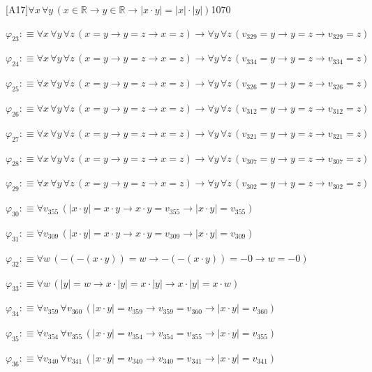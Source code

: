 \begin{fullproof}{[A17]}{$\forall x\,\forall y\,(x \in \mathbb{R} \to y \in \mathbb{R} \to \lvert x \cdot y \rvert = \lvert x \rvert \cdot \lvert y \rvert)$}{1070}
\begin{abbrevlist}
\item $\varphi_{23} :\equiv \forall x\,\forall y\,\forall z\,(x = y \to y = z \to x = z) \to \forall y\,\forall z\,(v_{329} = y \to y = z \to v_{329} = z)$
\item $\varphi_{24} :\equiv \forall x\,\forall y\,\forall z\,(x = y \to y = z \to x = z) \to \forall y\,\forall z\,(v_{334} = y \to y = z \to v_{334} = z)$
\item $\varphi_{25} :\equiv \forall x\,\forall y\,\forall z\,(x = y \to y = z \to x = z) \to \forall y\,\forall z\,(v_{326} = y \to y = z \to v_{326} = z)$
\item $\varphi_{26} :\equiv \forall x\,\forall y\,\forall z\,(x = y \to y = z \to x = z) \to \forall y\,\forall z\,(v_{312} = y \to y = z \to v_{312} = z)$
\item $\varphi_{27} :\equiv \forall x\,\forall y\,\forall z\,(x = y \to y = z \to x = z) \to \forall y\,\forall z\,(v_{321} = y \to y = z \to v_{321} = z)$
\item $\varphi_{28} :\equiv \forall x\,\forall y\,\forall z\,(x = y \to y = z \to x = z) \to \forall y\,\forall z\,(v_{307} = y \to y = z \to v_{307} = z)$
\item $\varphi_{29} :\equiv \forall x\,\forall y\,\forall z\,(x = y \to y = z \to x = z) \to \forall y\,\forall z\,(v_{302} = y \to y = z \to v_{302} = z)$
\item $\varphi_{30} :\equiv \forall v_{355}\,(\lvert x \cdot y \rvert = x \cdot y \to x \cdot y = v_{355} \to \lvert x \cdot y \rvert = v_{355})$
\item $\varphi_{31} :\equiv \forall v_{309}\,(\lvert x \cdot y \rvert = x \cdot y \to x \cdot y = v_{309} \to \lvert x \cdot y \rvert = v_{309})$
\item $\varphi_{32} :\equiv \forall w\,(-(-(x \cdot y)) = w \to -(-(x \cdot y)) = -0 \to w = -0)$
\item $\varphi_{33} :\equiv \forall w\,(\lvert y \rvert = w \to x \cdot \lvert y \rvert = x \cdot \lvert y \rvert \to x \cdot \lvert y \rvert = x \cdot w)$
\item $\varphi_{34} :\equiv \forall v_{359}\,\forall v_{360}\,(\lvert x \cdot y \rvert = v_{359} \to v_{359} = v_{360} \to \lvert x \cdot y \rvert = v_{360})$
\item $\varphi_{35} :\equiv \forall v_{354}\,\forall v_{355}\,(\lvert x \cdot y \rvert = v_{354} \to v_{354} = v_{355} \to \lvert x \cdot y \rvert = v_{355})$
\item $\varphi_{36} :\equiv \forall v_{340}\,\forall v_{341}\,(\lvert x \cdot y \rvert = v_{340} \to v_{340} = v_{341} \to \lvert x \cdot y \rvert = v_{341})$

\end{abbrevlist}
\end{fullproof}
